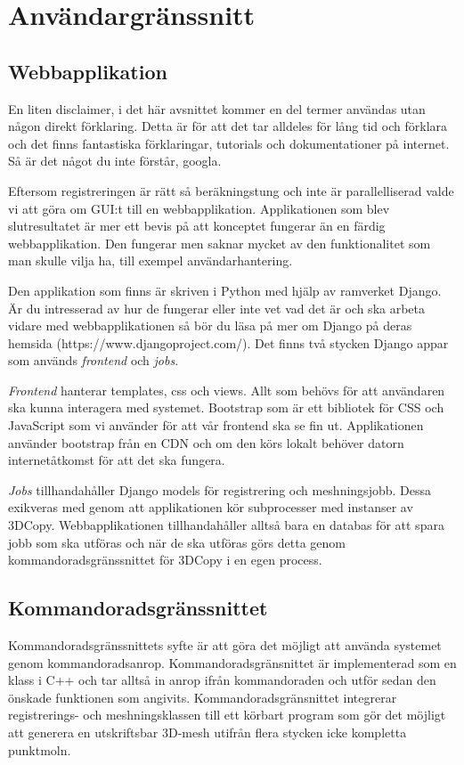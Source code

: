 \documentclass[a4paper,titlepage,12pt]{article}
\begin{document}
\newpage

\section{Användargränssnitt}
\subsection{Webbapplikation}
En liten disclaimer, i det här avsnittet kommer en del termer användas utan någon direkt förklaring. Detta är för att det tar alldeles för lång tid och förklara och det finns fantastiska förklaringar, tutorials och dokumentationer på internet. Så är det något du inte förstår, googla.

Eftersom registreringen är rätt så beräkningstung och inte är parallelliserad valde vi att göra om GUI:t till en webbapplikation. Applikationen som blev slutresultatet är mer ett bevis på att konceptet fungerar än en färdig webbapplikation. Den fungerar men saknar mycket av den funktionalitet som man skulle vilja ha, till exempel användarhantering. 

Den applikation som finns är skriven i Python med hjälp av ramverket Django. Är du intresserad av hur de fungerar eller inte vet vad det är och ska arbeta vidare med webbapplikationen så bör du läsa på mer om Django på deras hemsida (https://www.djangoproject.com/). Det finns två stycken Django appar som används \textit{frontend} och \textit{jobs}. 

\textit{Frontend} hanterar templates, css och views. Allt som behövs för att användaren ska kunna interagera med systemet. Bootstrap som är ett bibliotek för CSS och JavaScript som vi använder för att vår frontend ska se fin ut. Applikationen använder bootstrap från en CDN och om den körs lokalt behöver datorn internetåtkomst för att det ska fungera.

\textit{Jobs} tillhandahåller Django models för registrering och meshningsjobb. Dessa exikveras med genom att applikationen kör subprocesser med instanser av 3DCopy. Webbapplikationen tillhandahåller alltså bara en databas för att spara jobb som ska utföras och när de ska utföras görs detta genom kommandoradsgränssnittet för 3DCopy i en egen process.
 
\subsection{Kommandoradsgränssnittet}
Kommandoradsgränssnittets syfte är att göra det möjligt att använda systemet genom kommandoradsanrop. Kommandoradsgränsnittet är implementerad som en klass i C++ och tar alltså in anrop ifrån kommandoraden och utför sedan den önskade funktionen som angivits. Kommandoradsgränsnittet integrerar registrerings- och meshningsklassen till ett körbart program som gör det möjligt att generera en utskriftsbar 3D-mesh utifrån flera stycken icke kompletta punktmoln.
\end{document}
